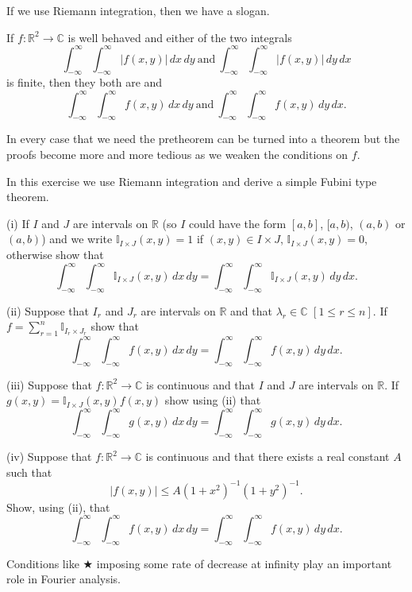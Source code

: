 If we use Riemann integration, then we have
a slogan.
\begin{pretheorem} If
$f:{\mathbb R}^{2}\rightarrow{\mathbb C}$ is well behaved
and either of the two integrals
\[\int_{-\infty}^{\infty}
\int_{-\infty}^{\infty}|f(x,y)|\,dx\,dy\ \text{and}
\ \int_{-\infty}^{\infty}
\int_{-\infty}^{\infty}|f(x,y)|\,dy\,dx\]
is finite, then they both are and
\[\int_{-\infty}^{\infty}
\int_{-\infty}^{\infty}f(x,y)\,dx\,dy\ \text{and}
\ \int_{-\infty}^{\infty}
\int_{-\infty}^{\infty}f(x,y)\,dy\,dx.\]
\end{pretheorem}
In every case that we need the pretheorem can be turned
into a theorem but the proofs become more and more tedious
as we weaken the conditions on $f$.

\begin{exercise}\label{Riemann meets Fubini} In this exercise
we use Riemann integration
and derive a simple Fubini type theorem.

(i) If $I$ and $J$ are intervals on ${\mathbb R}$ (so
$I$ could have the form $[a,b]$, $[a,b)$, $(a,b)$
or $(a,b)$) and we write ${\mathbb I}_{I\times J}(x,y)=1$
if $(x,y)\in I\times J$, ${\mathbb I}_{I\times J}(x,y)=0$,
otherwise show that
\[\int_{-\infty}^{\infty}
\int_{-\infty}^{\infty}{\mathbb I}_{I\times J}(x,y)\,dx\,dy=
\int_{-\infty}^{\infty}
\int_{-\infty}^{\infty}{\mathbb I}_{I\times J}(x,y)\,dy\,dx.\]

(ii) Suppose that $I_{r}$
and $J_{r}$ are intervals on ${\mathbb R}$
and that $\lambda_{r}\in{\mathbb C}$ $[1\leq r\leq n]$.
If $f=\sum_{r=1}^{n}{\mathbb I}_{I_{r}\times J_{r}}$
show that
\[\int_{-\infty}^{\infty}
\int_{-\infty}^{\infty}f(x,y)\,dx\,dy=
\int_{-\infty}^{\infty}
\int_{-\infty}^{\infty}f(x,y)\,dy\,dx.\]

(iii) Suppose that $f:{\mathbb R}^{2}\rightarrow{\mathbb C}$ is continuous
and that  $I$ and $J$ are intervals on ${\mathbb R}$. If
$g(x,y)={\mathbb I}_{I\times J}(x,y)f(x,y)$ show
using (ii) that
\[\int_{-\infty}^{\infty}
\int_{-\infty}^{\infty}g(x,y)\,dx\,dy=
\int_{-\infty}^{\infty}
\int_{-\infty}^{\infty}g(x,y)\,dy\,dx.\]

(iv) Suppose that $f:{\mathbb R}^{2}\rightarrow{\mathbb C}$ is continuous
and that there exists a real constant $A$ such that
\begin{equation*}
|f(x,y)|\leq A(1+x^{2})^{-1}(1+y^{2})^{-1}.
\tag*{$\bigstar$}
\end{equation*}
Show, using (ii), that
\[\int_{-\infty}^{\infty}
\int_{-\infty}^{\infty}f(x,y)\,dx\,dy=
\int_{-\infty}^{\infty}
\int_{-\infty}^{\infty}f(x,y)\,dy\,dx.\]
\end{exercise}
Conditions like $\bigstar$ imposing some rate of decrease
at infinity play an important role in Fourier
analysis.

